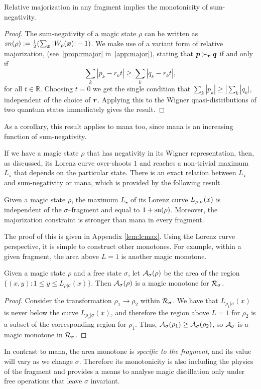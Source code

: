 \documentclass[pra,
aps,
twocolumn,
superscriptaddress,
groupedaddress,
nofootinbib,
reprint
]{revtex4-1}
\begin{document}
\begin{lemma} Relative majorization in any fragment implies the monotonicity of sum-negativity. 
\end{lemma}
\begin{proof}
	The sum-negativity of a magic state $\rho$ can be written as $sn(\rho) := \frac{1}{2} (\sum_{\boldsymbol{x}} |W_\rho(\boldsymbol{x}) | - 1)$.
We make use of a variant form of relative majorization, (see~\cref{prop:rmajor} in~\cref{app:major}), stating that $\boldsymbol{p} \succ_{\boldsymbol{r}} \boldsymbol{q}$ if and only if
	\begin{equation}
\sum_k | p_k - r_k t | \geq \sum_k | q_k - r_k t |,
\end{equation}
for all $t\in \mathbb{R}$. Choosing $t=0$ we get the single condition that $\sum_k |p_k| \ge |\sum_k |q_k|$, independent of the choice of $\boldsymbol{r}$. Applying this to the Wigner quasi-distributions of two quantum states immediately gives the result.
\end{proof}
As a corollary, this result applies to mana too, since mana is an increasing function of sum-negativity.

If we have a magic state $\rho$ that has negativity in its Wigner representation, then, as discussed, its Lorenz curve over-shoots $1$ and reaches a non-trivial maximum $L_\star$ that depends on the particular state. There is an exact relation between $L_\star$ and sum-negativity or mana, which is provided by the following result. 
\begin{lemma}\label{lem:lcmax}
	Given a magic state $\rho$, the maximum $L_\star$ of its Lorenz curve ${L_{\rho|\sigma}}(x)$ is independent of the $\sigma$--fragment and equal to $1+{{\rm{sn}}(\rho)}$. Moreover, the majorization constraint is stronger than mana in every fragment.
\end{lemma}
The proof of this is given in Appendix \ref{lem:lcmax}. Using the Lorenz curve perspective, it is simple to construct other monotones. For example, within a given fragment, the area above $L=1$ is another magic monotone.
\begin{lemma}
Given a magic state $\rho$ and a free state $\sigma$, let ${\mathcal A}_\sigma(\rho)$ be the area of the region $\{(x, y): 1 \leq y \leq L_{\rho | \sigma}(x)\}$. Then ${\mathcal A}_\sigma(\rho)$ is a magic monotone for $\mathcal{R}_\sigma$.
\end{lemma}
\begin{proof}
Consider the transformation $\rho_1 \rightarrow \rho_2$ within $\mathcal{R}_\sigma$. We have that $L_{\rho_1|\sigma}(x)$ is never below the curve $L_{\rho_2|\sigma}(x)$, and therefore the region above $L=1$ for $\rho_2$ is a subset of the corresponding region for $\rho_1$. Thus, ${\mathcal A}_\sigma(\rho_1) \geq {\mathcal A}_\sigma(\rho_2)$, so ${\mathcal A}_\sigma$ is a magic monotone in $\mathcal{R}_\sigma$.
\end{proof}
In contrast to mana, the area monotone is \emph{specific to the fragment}, and its value will vary as we change $\sigma$. Therefore its monotonicity is also including the physics of the fragment and provides a means to analyse magic distillation only under free operations that leave $\sigma$ invariant.
\end{document}
